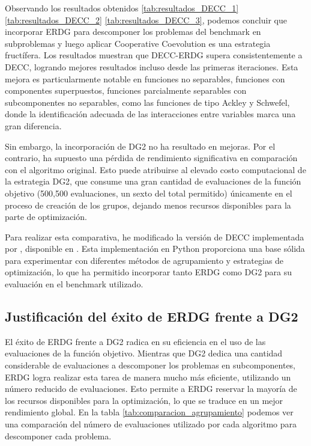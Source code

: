 Observando los resultados obtenidos \ref{tab:resultados_DECC_1} \ref{tab:resultados_DECC_2} \ref{tab:resultados_DECC_3}, podemos concluir que incorporar ERDG para descomponer los problemas del benchmark en subproblemas y luego aplicar Cooperative Coevolution es una estrategia fructífera. Los resultados muestran que DECC-ERDG supera consistentemente a DECC, logrando mejores resultados incluso desde las primeras iteraciones. Esta mejora es particularmente notable en funciones no separables, funciones con componentes superpuestos, funciones parcialmente separables con subcomponentes no separables, como las funciones de tipo Ackley y Schwefel, donde la identificación adecuada de las interacciones entre variables marca una gran diferencia.

Sin embargo, la incorporación de DG2 no ha resultado en mejoras. Por el contrario, ha supuesto una pérdida de rendimiento significativa en comparación con el algoritmo original. Esto puede atribuirse al elevado costo computacional de la estrategia DG2, que consume una gran cantidad de evaluaciones de la función objetivo (500,500 evaluaciones, un sexto del total permitido) únicamente en el proceso de creación de los grupos, dejando menos recursos disponibles para la parte de optimización.

Para realizar esta comparativa, he modificado la versión de DECC implementada por \citeauthor{moesioDECC}, disponible en \cite{moesioDECC}. Esta implementación en Python proporciona una base sólida para experimentar con diferentes métodos de agrupamiento y estrategias de optimización, lo que ha permitido incorporar tanto ERDG como DG2 para su evaluación en el benchmark utilizado.


\subsection{Justificación del éxito de ERDG frente a DG2}

El éxito de ERDG frente a DG2 radica en su eficiencia en el uso de las evaluaciones de la función objetivo. Mientras que DG2 dedica una cantidad considerable de evaluaciones a descomponer los problemas en subcomponentes, ERDG logra realizar esta tarea de manera mucho más eficiente, utilizando un número reducido de evaluaciones. Esto permite a ERDG reservar la mayoría de los recursos disponibles para la optimización, lo que se traduce en un mejor rendimiento global. En la tabla \ref{tab:comparacion_agrupamiento} podemos ver una comparación del número de evaluaciones utilizado por cada algoritmo para descomponer cada problema.


